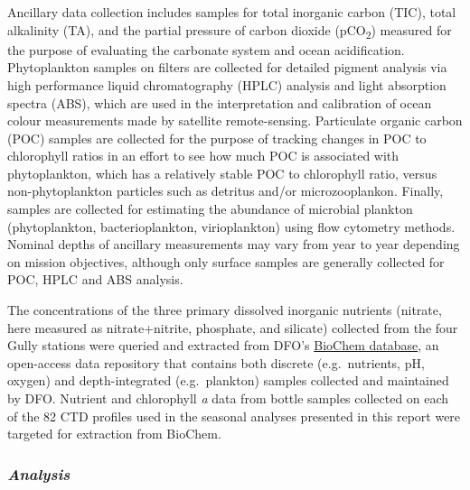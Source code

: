 \documentclass[12pt]{article}\usepackage[]{graphicx}\usepackage[]{color}
\begin{document}
Ancillary data collection includes samples for total inorganic carbon (TIC), total alkalinity (TA), and the partial pressure of carbon dioxide (pCO\textsubscript{2}) measured for the purpose of evaluating the carbonate system and ocean acidification. Phytoplankton samples on filters are collected for detailed pigment analysis via high performance liquid chromatography (HPLC) analysis and light absorption spectra (ABS), which are used in the interpretation and calibration of ocean colour measurements made by satellite remote-sensing. Particulate organic carbon (POC) samples are collected for the purpose of tracking changes in POC to chlorophyll ratios in an effort to see how much POC is associated with phytoplankton, which has a relatively stable POC to chlorophyll ratio, versus non-phytoplankton particles such as detritus and/or microzooplankon. Finally, samples are collected for estimating the abundance of microbial plankton (phytoplankton, bacterioplankton, virioplankton) using flow cytometry methods. Nominal depths of ancillary measurements may vary from year to year depending on mission objectives, although only surface samples are generally collected for POC, HPLC and ABS analysis.

The concentrations of the three primary dissolved inorganic nutrients (nitrate, here measured as nitrate+nitrite, phosphate, and silicate) collected from the four Gully stations were queried and extracted from DFO's \href{https://www.dfo-mpo.gc.ca/science/data-donnees/biochem/index-eng.html}{BioChem database}, an open-access data repository that contains both discrete (e.g.~nutrients, pH, oxygen) and depth-integrated (e.g.~plankton) samples collected and maintained by DFO. Nutrient and chlorophyll \emph{a} data from bottle samples collected on each of the 82 CTD profiles used in the seasonal analyses presented in this report were targeted for extraction from BioChem.

\hypertarget{analysis-1}{%
\subsubsection{\texorpdfstring{\emph{Analysis}}{Analysis}}\label{analysis-1}}
\end{document}
